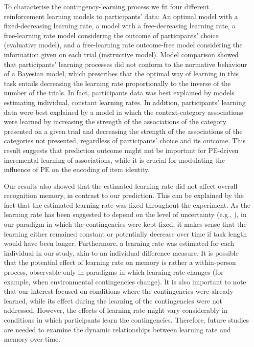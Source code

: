 \documentclass[a4paper,12pt]{article}
\begin{document}
 \par
To characterise the contingency-learning process we fit four different reinforcement learning models to participants' data: An optimal model with a fixed-decreasing learning rate, a model with a free-decreasing learning rate, a free-learning rate model considering the outcome of participants' choice (evaluative model), and a free-learning rate outcome-free model considering the information given on each trial (instructive model). Model comparison showed that participants' learning processes did not conform to the normative behaviour of a Bayesian model, which prescribes that the optimal way of learning in this task entails decreasing the learning rate proportionally to the inverse of the number of the trials. In fact, participants data was best explained by models estimating individual, constant learning rates. In addition, participants' learning data were best explained by a model in which the context-category associations were learned by increasing the strength of the associations of the category presented on a given trial and decreasing the strength of the associations of the categories not presented, regardless of participants' choice and its outcome. This result suggests that prediction outcome might not be important for PE-driven incremental learning of associations, while it is crucial for modulating the influence of PE on the encoding of item identity.  \par
Our results also showed that the estimated learning rate did not affect overall recognition memory, in contrast to our prediction. This can be explained by the fact that the estimated learning rate was fixed throughout the experiment. As the learning rate has been suggested to depend on the level of uncertainty (e.g., \citealp{Behrens2007}), in our paradigm in which the contingencies were kept fixed, it makes sense that the learning either remained constant or potentially decrease over time if task length would have been longer.
Furthermore, a learning rate was estimated for each individual in our study, akin to an individual difference measure. It is possible that the potential effect of learning rate on memory is rather a within-person process, observable only in paradigms in which learning rate changes (for example, when environmental contingencies change).
It is also important to note that our interest focused on conditions where the contingencies were already learned, while its effect during the learning of the contingencies were not addressed. However, the effects of learning rate might vary considerably in conditions in which participants learn the contingencies. Therefore, future studies are needed to examine the dynamic relationships between learning rate and memory over time.  
\end{document}
